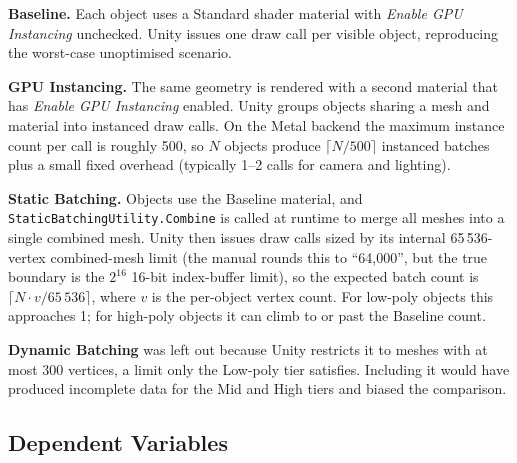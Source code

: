 \documentclass[11pt,a4paper]{article}
\begin{document}
\textbf{Baseline.} Each object uses a Standard shader material with
\textit{Enable GPU Instancing} unchecked. Unity issues one draw call per visible
object, reproducing the worst-case unoptimised scenario.

\textbf{GPU Instancing.} The same geometry is rendered with a second material that has
\textit{Enable GPU Instancing} enabled. Unity groups objects sharing a mesh and
material into instanced draw calls. On the Metal backend the maximum instance count
per call is roughly 500, so $N$ objects produce $\lceil N/500 \rceil$ instanced batches
plus a small fixed overhead (typically 1--2 calls for camera and lighting).

\textbf{Static Batching.} Objects use the Baseline material, and
\texttt{StaticBatchingUtility.Combine} is called at runtime to merge all meshes into a
single combined mesh. Unity then issues draw calls sized by its internal
65\,536-vertex combined-mesh limit (the manual rounds this to ``64{,}000'', but the
true boundary is the $2^{16}$ 16-bit index-buffer limit), so the expected batch count
is $\lceil N \cdot v / 65\,536 \rceil$, where $v$ is the per-object vertex count. For
low-poly objects this approaches 1; for high-poly objects it can climb to or past the
Baseline count.

\textbf{Dynamic Batching} was left out because Unity restricts it to meshes with at
most 300 vertices, a limit only the Low-poly tier satisfies. Including it would have
produced incomplete data for the Mid and High tiers and biased the comparison.

\subsection{Dependent Variables}
\end{document}
